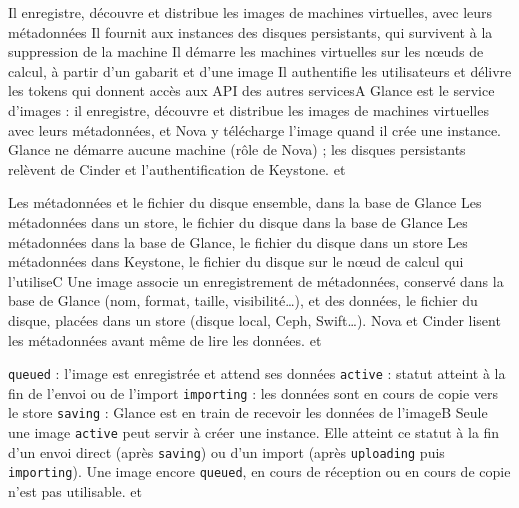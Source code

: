 
  {Il enregistre, découvre et distribue les images de machines virtuelles, avec leurs métadonnées}
  {Il fournit aux instances des disques persistants, qui survivent à la suppression de la machine}
  {Il démarre les machines virtuelles sur les nœuds de calcul, à partir d'un gabarit et d'une image}
  {Il authentifie les utilisateurs et délivre les tokens qui donnent accès aux API des autres services}{A}
  {Glance est le service d'images : il enregistre, découvre et distribue les images de machines virtuelles avec leurs métadonnées, et Nova y télécharge l'image quand il crée une instance. Glance ne démarre aucune machine (rôle de Nova) ; les disques persistants relèvent de Cinder et l'authentification de Keystone.}
  { et }

  {Les métadonnées et le fichier du disque ensemble, dans la base de Glance}
  {Les métadonnées dans un store, le fichier du disque dans la base de Glance}
  {Les métadonnées dans la base de Glance, le fichier du disque dans un store}
  {Les métadonnées dans Keystone, le fichier du disque sur le nœud de calcul qui l'utilise}{C}
  {Une image associe un enregistrement de métadonnées, conservé dans la base de Glance (nom, format, taille, visibilité\dots), et des données, le fichier du disque, placées dans un store (disque local, Ceph, Swift\dots). Nova et Cinder lisent les métadonnées avant même de lire les données.}
  { et }

  {\texttt{queued} : l'image est enregistrée et attend ses données}
  {\texttt{active} : statut atteint à la fin de l'envoi ou de l'import}
  {\texttt{importing} : les données sont en cours de copie vers le store}
  {\texttt{saving} : Glance est en train de recevoir les données de l'image}{B}
  {Seule une image \texttt{active} peut servir à créer une instance. Elle atteint ce statut à la fin d'un envoi direct (après \texttt{saving}) ou d'un import (après \texttt{uploading} puis \texttt{importing}). Une image encore \texttt{queued}, en cours de réception ou en cours de copie n'est pas utilisable.}
  { et }

